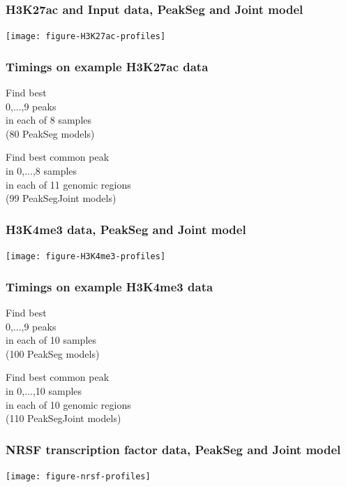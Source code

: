 \documentclass{beamer}
\begin{document}
\begin{frame}
  \frametitle{H3K27ac and Input data, PeakSeg and Joint model}

  \texttt{[image: figure-H3K27ac-profiles]}
\end{frame}

\begin{frame}
  \frametitle{Timings on example H3K27ac data}

  \scriptsize

  \parbox{2in}{
    Find best \\
  0,...,9 peaks\\
  in each of 8 samples\\
  (80 PeakSeg models)

  
  }
  \parbox{2in}{
  Find best common peak\\
  in 0,...,8 samples\\
  in each of 11 genomic regions\\
  (99 PeakSegJoint models)

  
  }

\end{frame}

\begin{frame}
  \frametitle{H3K4me3 data, PeakSeg and Joint model}

  \texttt{[image: figure-H3K4me3-profiles]}
\end{frame}

\begin{frame}
  \frametitle{Timings on example H3K4me3 data}

  \small

\parbox{1.5in}{
  Find best \\
  0,...,9 peaks\\
  in each of 10 samples\\
  (100 PeakSeg models)

  
}
\parbox{2in}{
  Find best common peak\\
  in 0,...,10 samples\\
  in each of 10 genomic regions\\
  (110 PeakSegJoint models)

  
}

\end{frame}

\begin{frame}
  \frametitle{NRSF transcription factor data, PeakSeg and Joint model}

  \texttt{[image: figure-nrsf-profiles]}
\end{frame}
\end{document}
